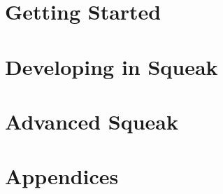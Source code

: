\documentclass[a4paper,10pt,twoside]{book}
\begin{document}
\part{Getting Started}




\part{Developing in Squeak}







\part{Advanced Squeak}

\appendix
\part{Appendices}



{\small\raggedright\printindex}
\cleardoublepage
~ %
\cleardoublepage
~ %
\cleardoublepage
\end{document}
